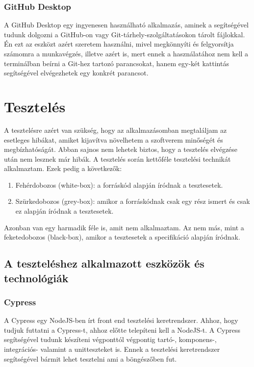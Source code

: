 \documentclass[]{thesis-ekf}
\theoremstyle{definition}
\theoremstyle{remark}
\begin{document}
	\subsection{GitHub Desktop}
		A GitHub Desktop egy ingyenesen használható alkalmazás, aminek a segítségével tudunk dolgozni a GitHub-on vagy Git-tárhely-szolgáltatásokon tárolt fájlokkal. Én ezt az eszközt azért szeretem használni, mivel megkönnyíti és felgyorsítja számomra a munkavégzés, illetve azért is, mert ennek a használatához nem kell a terminálban beírni a Git-hez tartozó parancsokat, hanem egy-két kattintás segítségével elvégezhetek egy konkrét parancsot.
		\cite{GitHubDesktop}
	
	\chapter{Tesztelés}
		A tesztelésre azért van szükség, hogy az alkalmazásomban megtaláljam az esetleges hibákat, amiket kijavítva növelhetem a szoftverem minőségét és megbízhatóságát. Abban sajnos nem lehetek biztos, hogy a tesztelés elvégzése után nem lesznek már hibák. A tesztelés során kettőféle tesztelési technikát alkalmaztam. Ezek pedig a következők:
		\begin{enumerate}
			\item Fehérdobozos (white-box): a forráskód alapján íródnak a tesztesetek.
			\item Szürkedobozos (grey-box): amikor a forráskódnak csak egy rész ismert és csak ez alapján íródnak a tesztesetek.
		\end{enumerate}
		Azonban van egy harmadik féle is, amit nem alkalmaztam. Az nem más, mint a feketedobozos (black-box), amikor a tesztesetek a specifikáció alapján íródnak.
		\cite[26-29.~oldal]{Kusper}
	\section{A teszteléshez alkalmazott eszközök és technológiák}
	\subsection{Cypress}
		A Cypress egy NodeJS-ben írt front end tesztelési keretrendszer. Ahhoz, hogy tudjuk futtatni a Cypress-t, ahhoz előtte telepíteni kell a NodeJS-t. A Cypress segítségével tudunk készíteni végponttól végpontig tartó-, komponens-, integrációs- valamint a unitteszteket is. Ennek a tesztelési keretrendszer segítségével bármit lehet tesztelni ami a böngészőben fut.
		\cite{Cypress}
		
\end{document}
